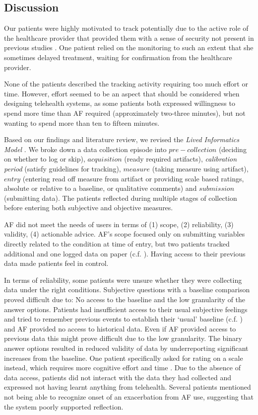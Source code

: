 \subsection{Discussion}
Our patients were highly motivated to track potentially due to the active role of the healthcare provider that provided them with a sense of security not present in previous studies \cite{Li2010, Ancker2015, Chung2015}. One patient relied on the monitoring to such an extent that she sometimes delayed treatment, waiting for confirmation from the healthcare provider.
 
None of the patients described the tracking activity requiring too much effort or time. However, effort seemed to be an aspect that should be considered when designing telehealth systems, as some patients both expressed willingness to spend more time than AF required (approximately two-three minutes), but not wanting to spend more than ten to fifteen minutes.

Based on our findings and literature review, we revised the \textit{Lived Informatics Model} \cite{Epstein2015}. We broke down a data collection episode into $pre-collection$ (deciding on whether to log or skip), $acquisition$ (ready required artifacts), \textit{calibration period} (satisfy guidelines for tracking), $measure$ (taking measure using artifact), $entry$ (entering read off measure from artifact or providing scale based ratings, absolute or relative to a baseline, or qualitative comments) and $submission$ (submitting data). The patients reflected during multiple stages of collection before entering both subjective and objective measures. 

AF did not meet the needs of users in terms of (1) scope, (2) reliability, (3) validity, (4) actionable advice. AF’s scope focused only on submitting variables directly related to the condition at time of entry, but two patients tracked additional and one logged data on paper (c.f. \cite{Patel2012, Chung2016}). Having access to their previous data made patients feel in control. 

In terms of reliability, some patients were unsure whether they were collecting data under the right conditions. Subjective questions with a baseline comparison proved difficult due to: No access to the baseline and the low granularity of the answer options. Patients had insufficient access to their usual subjective feelings and tried to remember previous events to establish their ‘usual’ baseline (c.f. \cite{piloting}) and AF provided no access to historical data. Even if AF provided access to previous data this might prove difficult due to the low granularity. The binary answer options resulted in reduced validity of data by underreporting significant increases from the baseline. One patient specifically asked for rating on a scale instead, which requires more cognitive effort and time \cite{Oh2015}. 
Due to the absence of data access, patients did not interact with the data they had collected and expressed not having learnt anything from telehealth. Several patients mentioned not being able to recognize onset of an exacerbation from AF use, suggesting that the system poorly supported reflection. 

